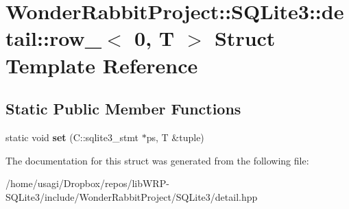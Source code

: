 \hypertarget{structWonderRabbitProject_1_1SQLite3_1_1detail_1_1row___3_010_00_01T_01_4}{\section{Wonder\-Rabbit\-Project\-:\-:S\-Q\-Lite3\-:\-:detail\-:\-:row\-\_\-$<$ 0, T $>$ Struct Template Reference}
\label{structWonderRabbitProject_1_1SQLite3_1_1detail_1_1row___3_010_00_01T_01_4}
}
\subsection*{Static Public Member Functions}
\begin{DoxyCompactItemize}
\item 
\hypertarget{structWonderRabbitProject_1_1SQLite3_1_1detail_1_1row___3_010_00_01T_01_4_a7b7e0b3b23072f9241c84708f4dd5751}{static void {\bfseries set} (C\-::sqlite3\-\_\-stmt $\ast$ps, T \&tuple)}\label{structWonderRabbitProject_1_1SQLite3_1_1detail_1_1row___3_010_00_01T_01_4_a7b7e0b3b23072f9241c84708f4dd5751}

\end{DoxyCompactItemize}


The documentation for this struct was generated from the following file\-:\begin{DoxyCompactItemize}
\item 
/home/usagi/\-Dropbox/repos/lib\-W\-R\-P-\/\-S\-Q\-Lite3/include/\-Wonder\-Rabbit\-Project/\-S\-Q\-Lite3/detail.\-hpp\end{DoxyCompactItemize}
